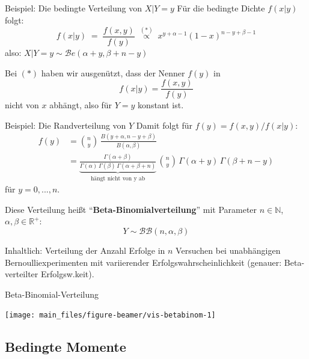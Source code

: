 \documentclass[
  10pt,
  ignorenonframetext,
]{beamer}
\begin{document}
\begin{frame}{Beispiel: Die bedingte Verteilung von \(X|Y=y\)}
\label{beispiel-die-bedingte-verteilung-von-xyy}
Für die bedingte Dichte \(f(x|y)\) folgt: \[
f(x|y) \; = \; \frac{f(x,y)}{f(y)} \; \stackrel{(*)}{\propto} \;
x^{y + \alpha - 1} (1 - x)^{n - y + \beta -1}
\] also: \(X|Y=y \sim {\mathcal Be}(\alpha + y, \beta + n -y)\)

Bei \((*)\) haben wir ausgenützt, dass der Nenner \(f(y)\) in \[
f(x|y) = \frac{f(x,y)}{f(y)}
\] nicht von \(x\) abhängt, also für \(Y = y\) konstant ist.

\end{frame}

\begin{frame}{Beispiel: Die Randverteilung von \(Y\)}
\label{beispiel-die-randverteilung-von-y}
Damit folgt für \(f(y) = {f(x,y)}/{f(x|y)}\): \begin{align*}
f(y) & =  {n \choose y} \, \frac{B(y + \alpha, n - y + \beta)}{B(\alpha, \beta)}\\
& =   \underbrace{\frac{\Gamma(\alpha + \beta)}{\Gamma(\alpha) \, \Gamma(\beta) \, \Gamma(\alpha + \beta +n)}}_{\mbox{hängt nicht von y ab}} \,
{n \choose y} \, \Gamma(\alpha + y) \, \Gamma(\beta + n - y)
\end{align*} für \(y = 0, ..., n\).

Diese Verteilung heißt ``\textbf{Beta-Binomialverteilung}'' mit
Parameter \(n \in \mathbb N\), \(\alpha, \beta \in \mathbb R^+\):
\[Y \sim {\mathcal B}{\mathcal B}(n, \alpha, \beta)\]

Inhaltlich: Verteilung der Anzahl Erfolge in \(n\) Versuchen bei
unabhängigen Bernoulliexperimenten mit variierender
Erfolgswahrscheinlichkeit (genauer: Beta-verteilter Erfolgsw.keit).
\end{frame}

\begin{frame}{Beta-Binomial-Verteilung}
\label{beta-binomial-verteilung}
\scriptsize

\begin{center}\texttt{[image: main\_files/figure-beamer/vis-betabinom-1]} \end{center}

\normalsize
\end{frame}

\subsection{Bedingte Momente}\label{bedingte-momente}
\end{document}
